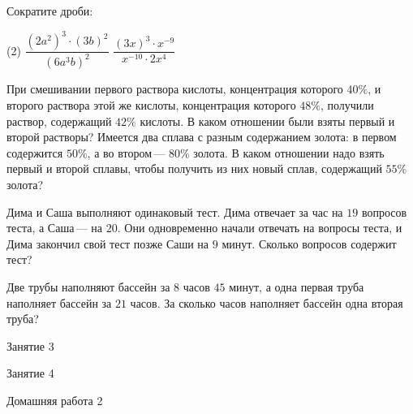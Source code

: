\begin{homework}[number=1]
	\begin{listofex}\item Сократите дроби:
		\begin{tasks}(2)
			\task \( \dfrac{(2a^2)^3\cdot(3b)^2}{(6a^3b)^2} \)
			\task \( \dfrac{(3x)^3\cdot x^{-9}}{x^{-10}\cdot2x^4} \)
		\end{tasks}
		\item При смешивании первого раствора кислоты, концентрация которого \( 40\% \), и второго раствора этой же кислоты, концентрация которого \( 48\% \), получили раствор, содержащий \( 42\% \) кислоты. В каком отношении были взяты первый и второй растворы?
		Имеется два сплава с разным содержанием золота: в первом содержится \( 50\% \), а во втором --- \( 80\% \) золота. В каком отношении надо взять первый и второй сплавы, чтобы получить из них новый сплав, содержащий \( 55\% \) золота?
		\item Дима и Саша выполняют одинаковый тест. Дима отвечает за час на \( 19 \) вопросов теста, а Саша --- на \( 20 \). Они одновременно начали отвечать на вопросы теста, и Дима закончил свой тест позже Саши на \( 9 \) минут. Сколько вопросов содержит тест?
		\item Две трубы наполняют бассейн за \( 8 \) часов \( 45 \) минут, а одна первая труба наполняет бассейн за \( 21 \) часов. За сколько часов наполняет бассейн одна вторая труба?
	\end{listofex}
\end{homework}

\begin{class}[number=3]
	\begin{listofex}
		\item Занятие 3 
	\end{listofex}
\end{class}

\begin{class}[number=4]
	\begin{listofex}
		\item Занятие 4
	\end{listofex}
\end{class}

\begin{homework}[number=2]
	\begin{listofex}
		\item Домашняя работа 2
	\end{listofex}
\end{homework}

